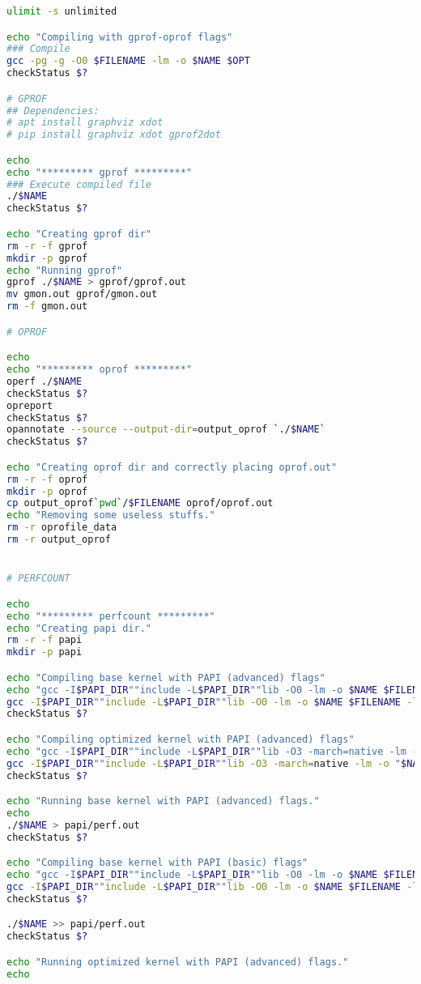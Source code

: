 \begin{lstlisting}[language=bash,breaklines=true]
ulimit -s unlimited

echo "Compiling with gprof-oprof flags"
### Compile
gcc -pg -g -O0 $FILENAME -lm -o $NAME $OPT
checkStatus $?

# GPROF
## Dependencies:
# apt install graphviz xdot
# pip install graphviz xdot gprof2dot

echo
echo "********* gprof *********"
### Execute compiled file
./$NAME
checkStatus $?

echo "Creating gprof dir"
rm -r -f gprof
mkdir -p gprof
echo "Running gprof"
gprof ./$NAME > gprof/gprof.out
mv gmon.out gprof/gmon.out
rm -f gmon.out

# OPROF

echo
echo "********* oprof *********"
operf ./$NAME
checkStatus $?
opreport
checkStatus $?
opannotate --source --output-dir=output_oprof `./$NAME`
checkStatus $?

echo "Creating oprof dir and correctly placing oprof.out" 
rm -r -f oprof
mkdir -p oprof
cp output_oprof`pwd`/$FILENAME oprof/oprof.out
echo "Removing some useless stuffs."
rm -r oprofile_data
rm -r output_oprof


# PERFCOUNT

echo
echo "********* perfcount *********"
echo "Creating papi dir."
rm -r -f papi
mkdir -p papi

echo "Compiling base kernel with PAPI (advanced) flags"
echo "gcc -I$PAPI_DIR""include -L$PAPI_DIR""lib -O0 -lm -o $NAME $FILENAME -lpapi -D PERFCOUNT2"
gcc -I$PAPI_DIR""include -L$PAPI_DIR""lib -O0 -lm -o $NAME $FILENAME -lpapi -D PERFCOUNT2
checkStatus $?

echo "Compiling optimized kernel with PAPI (advanced) flags"
echo "gcc -I$PAPI_DIR""include -L$PAPI_DIR""lib -O3 -march=native -lm -o "$NAME"_opt $FILENAME -lpapi -D PERFCOUNT2"
gcc -I$PAPI_DIR""include -L$PAPI_DIR""lib -O3 -march=native -lm -o "$NAME"_opt $FILENAME -lpapi -D PERFCOUNT2
checkStatus $?

echo "Running base kernel with PAPI (advanced) flags."
echo
./$NAME > papi/perf.out
checkStatus $?

echo "Compiling base kernel with PAPI (basic) flags"
echo "gcc -I$PAPI_DIR""include -L$PAPI_DIR""lib -O0 -lm -o $NAME $FILENAME -lpapi -D PERFCOUNT"
gcc -I$PAPI_DIR""include -L$PAPI_DIR""lib -O0 -lm -o $NAME $FILENAME -lpapi -D PERFCOUNT
checkStatus $?

./$NAME >> papi/perf.out
checkStatus $?

echo "Running optimized kernel with PAPI (advanced) flags."
echo


\end{lstlisting}
